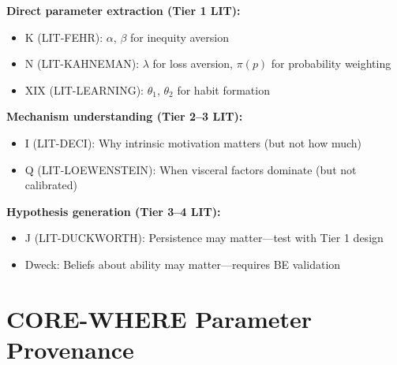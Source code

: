 \documentclass[11pt, a4paper]{article}
\begin{document}
\begin{tcolorbox}[colback=green!5!white, colframe=green!75!black,
    title=Using LIT Appendices for CORE-WHERE]

\textbf{Direct parameter extraction (Tier 1 LIT):}
\begin{itemize}[nosep]
\item K (LIT-FEHR): $\alpha$, $\beta$ for inequity aversion
\item N (LIT-KAHNEMAN): $\lambda$ for loss aversion, $\pi(p)$ for probability weighting
\item XIX (LIT-LEARNING): $\theta_1$, $\theta_2$ for habit formation
\end{itemize}

\textbf{Mechanism understanding (Tier 2--3 LIT):}
\begin{itemize}[nosep]
\item I (LIT-DECI): Why intrinsic motivation matters (but not how much)
\item Q (LIT-LOEWENSTEIN): When visceral factors dominate (but not calibrated)
\end{itemize}

\textbf{Hypothesis generation (Tier 3--4 LIT):}
\begin{itemize}[nosep]
\item J (LIT-DUCKWORTH): Persistence may matter---test with Tier 1 design
\item Dweck: Beliefs about ability may matter---requires BE validation
\end{itemize}

\end{tcolorbox}


\section{CORE-WHERE Parameter Provenance}
\label{sec:evd-bbb-mapping}
\end{document}
